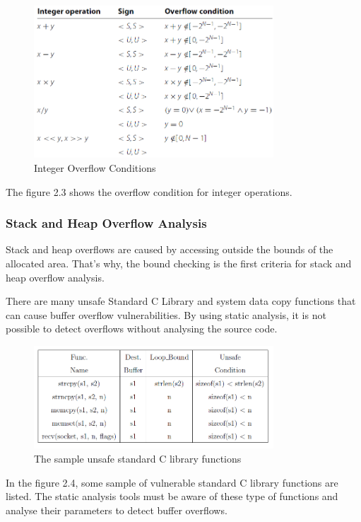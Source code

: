 \begin{figure}[!htbp]
    \centering
    \includegraphics[width=0.8\textwidth]{Imgs/Integer_Overflow_conditions.png}
    \caption{\label{fig:SysArch}Integer Overflow Conditions}
\end{figure}

The figure 2.3 shows the overflow condition for integer operations. \cite{Three}

\subsubsection{Stack and Heap Overflow Analysis}
Stack and heap overflows are caused by accessing outside the bounds of the allocated area. That's why, the bound checking is the first criteria for stack and heap overflow analysis.

There are many unsafe Standard C Library and system data copy functions that can cause buffer overflow vulnerabilities. By using static analysis, it is not possible to detect overflows without analysing the source code. 

\begin{figure}[!htbp]
    \centering
    \includegraphics[width=0.8\textwidth]{Imgs/unsafefuncs.png}
    \caption{\label{fig:SysArch}The sample unsafe standard C library functions \cite{One}}
\end{figure}

In the figure 2.4, some sample of vulnerable standard C library functions are listed. The static analysis tools must be aware of these type of functions and analyse their parameters to detect buffer overflows.

